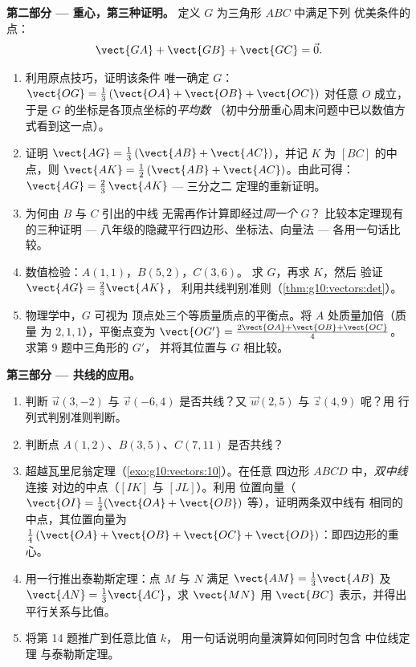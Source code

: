 \begin{problem}
\medskip
\noindent\textbf{第二部分 --- 重心，第三种证明。}
定义 $G$ 为三角形 $ABC$ 中满足下列
优美条件的点：
\[
\vect{GA} + \vect{GB} + \vect{GC} = \vec 0 .
\]
\begin{enumerate}[resume]
  \item 利用原点技巧，证明该条件
        唯一确定 $G$：
        $\vect{OG} = \frac13\left(\vect{OA} + \vect{OB} +
        \vect{OC}\right)$ 对任意 $O$ 成立，于是
        $G$ 的坐标是各顶点坐标的\emph{平均数}
        （初中分册重心周末问题中已以数值方式看到这一点）。
  \item 证明 $\vect{AG} = \frac13\left(\vect{AB} +
        \vect{AC}\right)$，并记 $K$ 为
        $[BC]$ 的中点，则 $\vect{AK} = \frac12\left(\vect{AB} +
        \vect{AC}\right)$。由此可得：
        $\vect{AG} = \frac23\,\vect{AK}$ --- 三分之二
        定理的重新证明。
  \item 为何由 $B$ 与 $C$ 引出的中线
        无需再作计算即经过\emph{同一个} $G$？
        比较本定理现有的三种证明 ---
        八年级的隐藏平行四边形、坐标法、向量法 ---
        各用一句话比较。
  \item 数值检验：$A(1, 1)$，$B(5, 2)$，$C(3, 6)$。
        求 $G$，再求 $K$，然后
        验证 $\vect{AG} = \frac23 \vect{AK}$，
        利用共线判别准则（\cref{thm:g10:vectors:det}）。
  \item 物理学中，$G$ 可视为
        顶点处三个等质量质点的平衡点。将 $A$ 处质量加倍（质量
        为 $2, 1, 1$），平衡点变为
        $\vect{OG'} = \frac{2\vect{OA} + \vect{OB} +
        \vect{OC}}{4}$。求第 9 题中三角形的 $G'$，
        并将其位置与 $G$ 相比较。
\end{enumerate}

\medskip
\noindent\textbf{第三部分 --- 共线的应用。}
\begin{enumerate}[resume]
  \item 判断 $\vec u(3, -2)$ 与 $\vec v(-6, 4)$ 是否共线？又
        $\vec w(2, 5)$ 与 $\vec z(4, 9)$ 呢？用
        行列式判别准则判断。
  \item 判断点 $A(1, 2)$、$B(3, 5)$、$C(7, 11)$
        是否共线？
  \item 超越瓦里尼翁定理（\cref{exo:g10:vectors:10}）。在任意
        四边形 $ABCD$ 中，\emph{双中线}连接
        对边的中点（$[IK]$ 与 $[JL]$）。利用
        位置向量（$\vect{OI} = \frac12(\vect{OA} +
        \vect{OB})$ 等），证明两条双中线有
        相同的中点，其位置向量为
        $\frac14\left(\vect{OA} + \vect{OB} + \vect{OC} +
        \vect{OD}\right)$：即四边形的重心。
  \item 用一行推出泰勒斯定理：点 $M$ 与 $N$ 满足
        $\vect{AM} = \frac13\vect{AB}$ 及
        $\vect{AN} = \frac13\vect{AC}$，求
        $\vect{MN}$ 用 $\vect{BC}$ 表示，并得出
        平行关系与比值。
  \item 将第 14 题推广到任意比值 $k$，
        用一句话说明向量演算如何同时包含
        中位线定理
        与泰勒斯定理。
\end{enumerate}


\end{problem}
